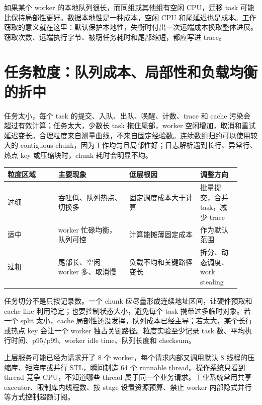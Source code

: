 如果某个 worker 的本地队列很长，而同组或其他组有空闲 CPU，迁移 task 可能比保持局部性更好。数据本地性是一种成本，空闲 CPU 和尾延迟也是成本。工作窃取的意义就在这里：默认保护本地性，失衡时付出一次远端成本换取整体进展。窃取次数、远端执行字节、被窃任务耗时和尾部缩短，都应写进 trace。

\section{任务粒度：队列成本、局部性和负载均衡的折中}

任务太小，每个 task 的提交、入队、出队、唤醒、计数、trace 和 cache 污染会超过有效计算；任务太大，少数长 task 拖住尾部，worker 空闲增加，取消和重试延迟变长。合理粒度来自测量曲线，不来自固定经验数。连续数组归约可以使用较大的 contiguous chunk，因为工作均匀且局部性好；日志解析遇到长行、异常行、热点 key 或压缩块时，chunk 耗时会明显不均。

\begin{center}
\begin{tabular}{@{}p{0.20\linewidth}p{0.28\linewidth}p{0.28\linewidth}p{0.16\linewidth}@{}}
\toprule
粒度区域 & 主要现象 & 低层根因 & 调整方向 \\
\midrule
过细 & 吞吐低、队列热点、切换多 & 固定调度成本大于计算 & 批量提交，合并 task，减少 trace \\
适中 & worker 忙碌均衡，队列可控 & 计算能摊薄固定成本 & 作为默认范围 \\
过粗 & 尾部长、空闲 worker 多、取消慢 & 负载不均和关键路径变长 & 拆分、动态调度、work stealing \\
\bottomrule
\end{tabular}
\end{center}

任务切分不是只按记录数。一个 chunk 应尽量形成连续地址区间，让硬件预取和 cache line 利用稳定；也要控制状态大小，避免每个 task 携带过多临时对象。若一个 split 太小，cache 局部性还没发挥，队列成本已经主导；若太大，某个长行或热点 key 会让一个 worker 独占关键路径。粒度实验至少记录 task 数、平均执行时间、p95/p99、worker idle time、队列长度和 checksum。

上层服务可能已经为请求开了 8 个 worker，每个请求内部又调用默认 8 线程的压缩库、矩阵库或并行 STL，瞬间制造 64 个 runnable thread。操作系统只看到 thread 竞争 CPU，不知道哪些 thread 属于同一个业务请求。工业系统常用共享 executor、限制库内线程数、按 stage 设置资源预算、禁止 worker 内部隐式并行等方式控制超额订阅。

